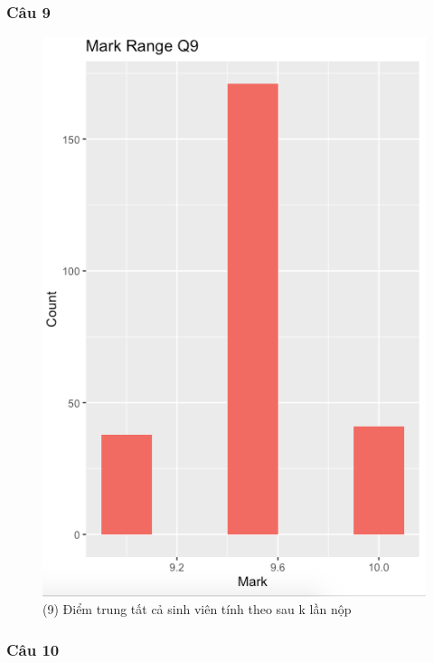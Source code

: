 \documentclass[a4paper]{article}
\theoremstyle{definition}
\begin{document}
\subsubsection{Câu 9}
\begin{figure}[!ht]
    \centering
    \includegraphics[scale=0.4]{Pics/q9-plot3.png}
    \caption{(9) Điểm trung tất cả sinh viên tính theo sau k lần nộp}
    \label{fig:my_label}
\end{figure}
\subsubsection{Câu 10}
\newpage
\end{document}
